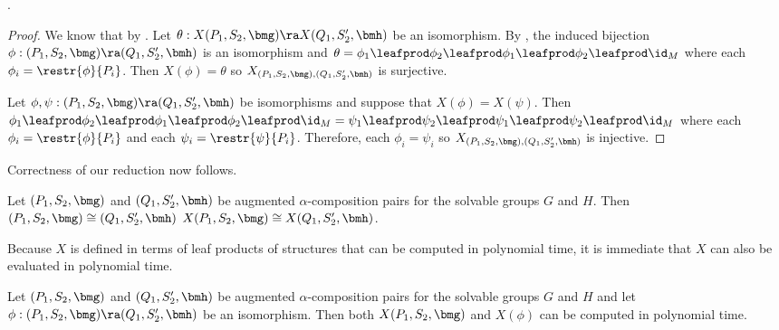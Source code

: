 \begin{theorem}
\label{thm:X-fff}
.
\end{theorem}

\begin{proof}
We know that  by .  Let $\theta : X(P_1, S_2, \bmg) \ra X(Q_1, S_2', \bmh)$ be an isomorphism.  By , the induced bijection $\phi : (P_1, S_2, \bmg) \ra (Q_1, S_2', \bmh)$ is an isomorphism and $\theta = \phi_1 \leafprod \phi_2 \leafprod \phi_1 \leafprod \phi_2 \leafprod \id_M$ where each $\phi_i = \restr{\phi}{P_i}$.  Then $X(\phi) = \theta$ so $X_{(P_1, S_2, \bmg), (Q_1, S_2', \bmh)}$ is surjective.

Let $\phi, \psi : (P_1, S_2, \bmg) \ra (Q_1, S_2', \bmh)$ be isomorphisms and suppose that $X(\phi) = X(\psi)$.  Then $\phi_1 \leafprod \phi_2 \leafprod \phi_1 \leafprod \phi_2 \leafprod \id_M = \psi_1 \leafprod \psi_2 \leafprod \psi_1 \leafprod \psi_2 \leafprod \id_M$ where each $\phi_i = \restr{\phi}{P_i}$ and each $\psi_i = \restr{\psi}{P_i}$.  Therefore, each $\phi_i = \psi_i$ so $X_{(P_1, S_2, \bmg), (Q_1, S_2', \bmh)}$ is injective.
\end{proof}

Correctness of our reduction now follows.

\begin{corollary}
  \label{cor:aug-alpha-red-cor}
  Let $(P_1, S_2, \bmg)$ and $(Q_1, S_2', \bmh)$ be augmented $\alpha$-composition pairs for the solvable groups $G$ and $H$.  Then $(P_1, S_2, \bmg) \cong (Q_1, S_2', \bmh)$ \ifft $X(P_1, S_2, \bmg) \cong X(Q_1, S_2', \bmh)$.
\end{corollary}

Because $X$ is defined in terms of leaf products of structures that can be computed in polynomial time, it is immediate that $X$ can also be evaluated in polynomial time.

\begin{lemma}
  \label{lem:X-poly}
  Let $(P_1, S_2, \bmg)$ and $(Q_1, S_2', \bmh)$ be augmented $\alpha$-composition pairs for the solvable groups $G$ and $H$ and let $\phi : (P_1, S_2, \bmg) \ra (Q_1, S_2', \bmh)$ be an isomorphism.  Then both $X(P_1, S_2, \bmg)$ and $X(\phi)$ can be computed in polynomial time.
\end{lemma}

